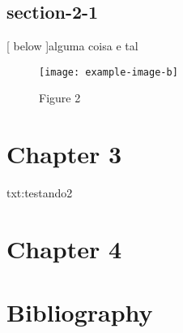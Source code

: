 \documentclass{book}
\begin{document}
\econ[2]

\section{section-2-1}

\clearpage{}
[ below ]{alguma coisa e tal}


\begin{figure}[hb]
  \centering
  \caption{Figure 2}
  \texttt{[image: example-image-b]}
\end{figure}


\hyperlink{figure.2.1}{}

\chapter{Chapter 3}


\begin{zrcregion}{txt:testando2}
  \econ[5]
\end{zrcregion}




\chapter{Chapter 4}

\econ[4]




\backmatter



\chapter{Bibliography}
\end{document}
